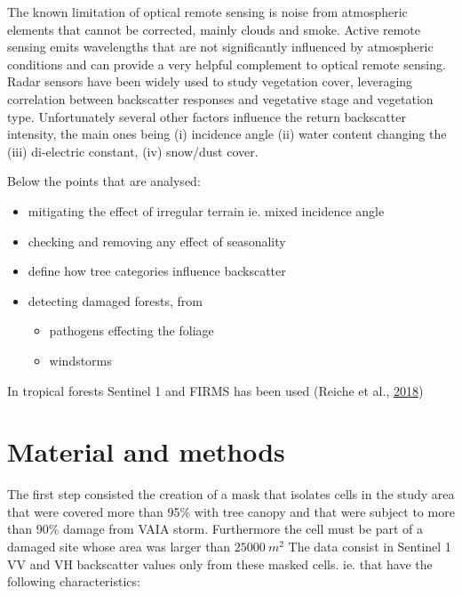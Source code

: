 \documentclass[smallextended]{svjour3}       %
\providecommand{\tightlist}{%
  \setlength{\itemsep}{0pt}\setlength{\parskip}{0pt}}
\begin{document}
The known limitation of optical remote sensing is noise from atmospheric
elements that cannot be corrected, mainly clouds and smoke. Active
remote sensing emits wavelengths that are not significantly influenced
by atmospheric conditions and can provide a very helpful complement to
optical remote sensing. Radar sensors have been widely used to study
vegetation cover, leveraging correlation between backscatter responses
and vegetative stage and vegetation type. Unfortunately several other
factors influence the return backscatter intensity, the main ones being
(i) incidence angle (ii) water content changing the (iii) di-electric
constant, (iv) snow/dust cover.

Below the points that are analysed:

\begin{itemize}
\tightlist
\item
  mitigating the effect of irregular terrain ie. mixed incidence angle
\item
  checking and removing any effect of seasonality
\item
  define how tree categories influence backscatter
\item
  detecting damaged forests, from

  \begin{itemize}
  \tightlist
  \item
    pathogens effecting the foliage
  \item
    windstorms
  \end{itemize}
\end{itemize}

In tropical forests Sentinel 1 and FIRMS has been used (Reiche et al.,
\protect\hyperlink{ref-Reiche2018}{2018})

\hypertarget{material-and-methods}{%
\section{Material and methods}\label{material-and-methods}}

The first step consisted the creation of a mask that isolates cells in
the study area that were covered more than 95\% with tree canopy and
that were subject to more than 90\% damage from VAIA storm. Furthermore
the cell must be part of a damaged site whose area was larger than
\(25000\ m^2\) The data consist in Sentinel 1 VV and VH backscatter
values only from these masked cells. ie. that have the following
characteristics:
\end{document}

